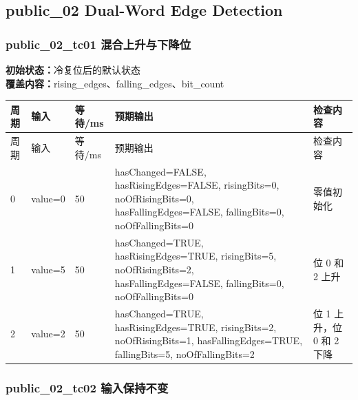 \subsection{{\ttfamily public\_02} Dual-Word Edge Detection}

\subsubsection{{\ttfamily public\_02\_tc01} 混合上升与下降位}

\noindent\textbf{初始状态：}冷复位后的默认状态\\

\textbf{覆盖内容：}rising\_edges、falling\_edges、bit\_count

\begin{longtable}{L{1.0cm}L{4.7cm}L{1.4cm}L{4.0cm}L{2.1cm}}

\toprule

周期 & 输入 & 等待/ms & 预期输出 & 检查内容\\

\midrule

\endfirsthead

\toprule

周期 & 输入 & 等待/ms & 预期输出 & 检查内容\\

\midrule

\endhead

0 & value=0 & 50 & hasChanged=FALSE, hasRisingEdges=FALSE, risingBits=0, noOfRisingBits=0, hasFallingEdges=FALSE, fallingBits=0, noOfFallingBits=0 & 零值初始化\\

1 & value=5 & 50 & hasChanged=TRUE, hasRisingEdges=TRUE, risingBits=5, noOfRisingBits=2, hasFallingEdges=FALSE, fallingBits=0, noOfFallingBits=0 & 位 0 和 2 上升\\

2 & value=2 & 50 & hasChanged=TRUE, hasRisingEdges=TRUE, risingBits=2, noOfRisingBits=1, hasFallingEdges=TRUE, fallingBits=5, noOfFallingBits=2 & 位 1 上升，位 0 和 2 下降\\

\bottomrule

\end{longtable}

\subsubsection{{\ttfamily public\_02\_tc02} 输入保持不变}

